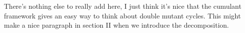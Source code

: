\documentclass[%
 preprint,
 amsmath,amssymb,
 aps,
]{revtex4-1}
\begin{document}
There's nothing else to really add here, I just think it's nice that the cumulant framework gives an easy way to think about double mutant cycles.  This might make a nice paragraph in section II when we introduce the decomposition.  

 
 
\clearpage



\end{document}
